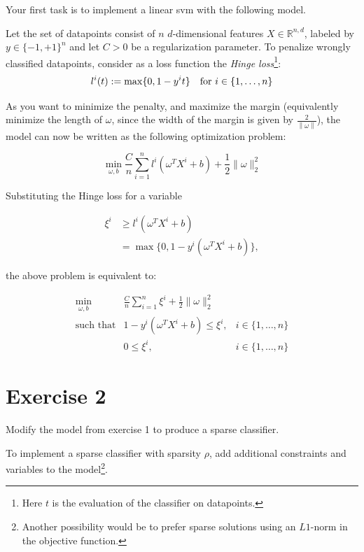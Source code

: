 \documentclass[11pt]{article}
\newcommand{\R}{\mathbb{R}}
\newcommand{\norm}[1]{\left\lVert#1\right\rVert}
\begin{document}
Your first task is to implement a linear svm with the following model.

Let the set of datapoints consist of $n$ $d$-dimensional features $X \in \R^{n,d}$, labeled by $y \in \{-1,+1\}^{n}$ and let $C > 0$ be a regularization parameter.
To penalize wrongly classified datapoints, consider as a loss function the \emph{Hinge loss}\footnote{
  Here $t$ is the evaluation of the classifier on datapoints.}:
$$l^{i}(t) :=  \max \{0, 1 - y^i t\} \text{\quad for } i \in \{1,\dots, n\}$$

As you want to minimize the penalty, and maximize the margin (equivalently minimize the length of $\omega$, since the width of the margin is given by $\frac{2}{\norm{\omega}}$), the model can now be written as the following optimization problem:

$$
\min\limits_{\omega, b}
\frac{C}{n} \sum\limits_{i = 1}^{n} l^i(\omega^{T}X^{i} + b)
+\frac{1}{2} \lVert \omega \rVert_{2}^{2}
$$

Substituting the Hinge loss for a variable

$$ \begin{aligned}
\xi^i &\geq l^i( \omega^T X^i + b ) \\
&= \max \{0, 1 - y^i (\omega^TX^i + b) \},
\end{aligned} $$

the above problem is equivalent to:

\begin{equation*}
\begin{array}{rll}
  \min\limits_{\omega, b}
  & \frac{C}{n} \sum\limits_{i = 1}^n \xi^i + \frac{1}{2} \lVert \omega \rVert_2^2
\\
  \text{such that}
  & 1 - y^i (\omega^T X^i +b) \leq \xi^i,
  & i \in \{1,\dots,n\}
\\
  & 0 \leq \xi^i,
  & i \in \{1,\dots, n\}
\end{array}
\end{equation*}

\section*{Exercise 2}

Modify the model from exercise 1 to produce a sparse classifier.

To implement a sparse classifier with sparsity $\rho$, add additional constraints and variables to the model\footnote{
  Another possibility would be to prefer sparse solutions using an $L1$-norm in the objective function.}.
\end{document}
